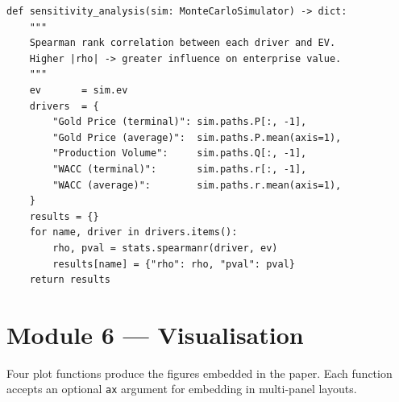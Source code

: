 \begin{lstlisting}[style=python, caption={Sensitivity analysis via Spearman rank correlations}]
def sensitivity_analysis(sim: MonteCarloSimulator) -> dict:
    """
    Spearman rank correlation between each driver and EV.
    Higher |rho| -> greater influence on enterprise value.
    """
    ev       = sim.ev
    drivers  = {
        "Gold Price (terminal)": sim.paths.P[:, -1],
        "Gold Price (average)":  sim.paths.P.mean(axis=1),
        "Production Volume":     sim.paths.Q[:, -1],
        "WACC (terminal)":       sim.paths.r[:, -1],
        "WACC (average)":        sim.paths.r.mean(axis=1),
    }
    results = {}
    for name, driver in drivers.items():
        rho, pval = stats.spearmanr(driver, ev)
        results[name] = {"rho": rho, "pval": pval}
    return results
\end{lstlisting}

\section*{Module 6 — Visualisation}

Four plot functions produce the figures embedded in the paper.
Each function accepts an optional \texttt{ax} argument for embedding
in multi-panel layouts.

